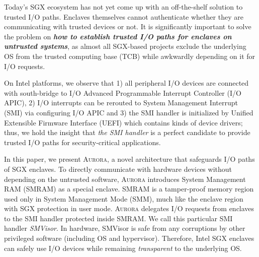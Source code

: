 Today's SGX ecosystem has not yet come up with an off-the-shelf solution to trusted I/O paths. Enclaves themselves cannot authenticate whether they are communicating with trusted devices or not. It is significantly important to solve the problem on \textbf{\emph{how to establish trusted I/O paths for enclaves on untrusted systems}}, as almost all SGX-based projects exclude the underlying OS from the trusted computing base (TCB) while awkwardly depending on it for I/O requests.

On Intel platforms, we observe that 1) all peripheral I/O devices are connected with south-bridge to I/O Advanced Programmable Interrupt Controller (I/O APIC), 2) I/O interrupts can be rerouted to System Management Interrupt (SMI) via configuring I/O APIC and 3) the SMI handler is initialized by Unified Extensible Firmware Interface (UEFI) which contains kinds of device drivers; thus, we hold the insight that \textit{the SMI handler} is a perfect candidate to provide trusted I/O paths for security-critical applications.

In this paper, we present \textsc{Aurora}, a novel architecture that safeguards I/O paths of SGX enclaves. To directly communicate with hardware devices without depending on the untrusted software, \textsc{Aurora} introduces System Management RAM (SMRAM) as a special enclave. SMRAM is a tamper-proof memory region used only in System Management Mode (SMM), much like the enclave region with SGX protection in user mode. \textsc{Aurora} delegates I/O requests from enclaves to the SMI handler protected inside SMRAM. We call this particular SMI handler \textit{SMVisor}. In hardware, SMVisor is safe from any corruptions by other privileged software (including OS and hypervisor). Therefore, Intel SGX enclaves can safely use I/O devices while remaining \textit{transparent} to the underlying OS.

